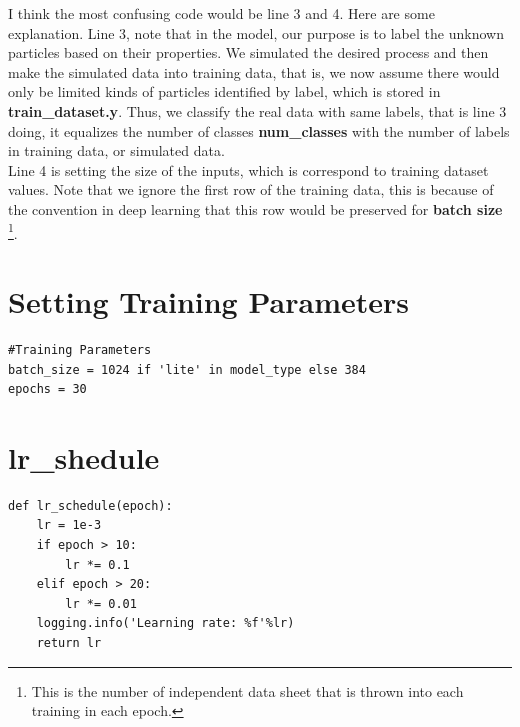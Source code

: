 \documentclass[12pt]{report}
\numberwithin{equation}{section}
\begin{document}
I think the most confusing code would be line 3 and 4. Here are some explanation. Line 3, note that in the model, our purpose is to label the unknown particles based on their properties.
 We simulated the desired process and then make the simulated data into training data, that is, we now assume there would only be limited kinds of particles identified by label, which is stored in \textbf{train\_dataset.y}.
 Thus, we classify the real data with same labels, that is line 3 doing, it equalizes the number of classes \textbf{num\_classes} with the number of labels in training data, or simulated data.
\\\indent
Line 4 is setting the size of the inputs, which is correspond to training dataset values.
Note that we ignore the first row of the training data, this is because of the convention in deep learning that this row would be preserved for \textbf{batch size}
\footnote{This is the number of independent data sheet that is thrown into each training in each epoch.}.

\section{Setting Training Parameters}
\begin{lstlisting}
#Training Parameters
batch_size = 1024 if 'lite' in model_type else 384
epochs = 30
\end{lstlisting}

\section{lr\_shedule}
\begin{lstlisting}
def lr_schedule(epoch):
    lr = 1e-3
    if epoch > 10:
        lr *= 0.1
    elif epoch > 20:
        lr *= 0.01
    logging.info('Learning rate: %f'%lr)
    return lr
\end{lstlisting}
\end{document}
